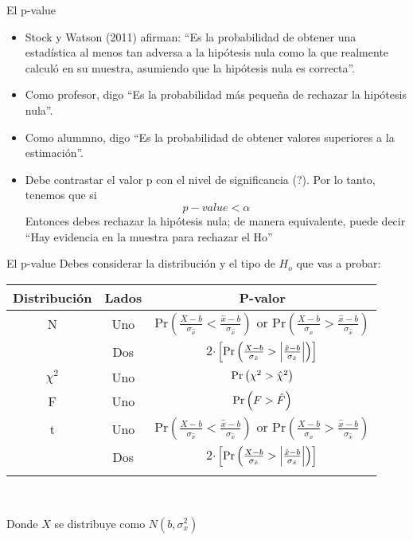 \begin{frame}{El p-value}
	\begin{itemize}
		\item Stock y Watson (2011) afirman: ``Es la probabilidad de obtener una estadística al menos tan adversa a la hipótesis nula como la que realmente calculó en su muestra, asumiendo que la hipótesis nula es correcta''.
		\item Como profesor, digo ``Es la probabilidad más pequeña de rechazar la hipótesis nula''.
		\item Como alummno, digo  ``Es la probabilidad de obtener valores superiores a la estimación''.
		\item Debe contrastar el valor p con el nivel de significancia (?). Por lo tanto, tenemos que si 
			$$p-value < \alpha$$
		Entonces debes rechazar la hipótesis nula; de manera equivalente, puede decir ``Hay evidencia en la muestra para rechazar el Ho''
	\end{itemize}
\end{frame}
\begin{frame}{El p-value}
	Debes considerar la distribución y el tipo de $H_o$ que vas a probar:\\
		\medskip
		{\small{\centering
		\begin{tabular}{ccc} 
			\hline
				Distribución & Lados & P-valor\\
			\hline
					\addlinespace[1ex]
				N		 & Uno & Pr$\left(\frac{X-b}{\sigma_{\hat{x}}} < \frac{\hat{x}-b}{\sigma_{\hat{x}}} \right)$ or Pr$\left(\frac{X-b}{\sigma_{\hat{x}}} > \frac{\hat{x}-b}{\sigma_{\hat{x}}} \right)$\\
					\addlinespace[1ex]
				{}       & Dos & 2$\cdot \left[ \textup{Pr}\left(\frac{X-b}{\sigma_{\hat{x}}} > \left|  \frac{\hat{x}-b}{\sigma_{\hat{x}}}\right| \right)\right] $\\
					\addlinespace[1ex]
			\hline
					\addlinespace[1ex]
				$\chi^2$ & Uno & $\textup{Pr}\left(\chi^{2} > \hat{\chi}^{2} \right) $\\
					\addlinespace[1ex]
			\hline
					\addlinespace[1ex]
				F		 & Uno & $\textup{Pr}\left( F > \hat{F} \right) $\\
					\addlinespace[1ex]
			\hline
					\addlinespace[1ex]
				t		 & Uno & Pr$\left(\frac{X-b}{\sigma_{\hat{x}}} < \frac{\hat{x}-b}{\sigma_{\hat{x}}} \right)$ or Pr$\left(\frac{X-b}{\sigma_{\hat{x}}} > \frac{\hat{x}-b}{\sigma_{\hat{x}}} \right)$\\
					\addlinespace[1ex]
				{}       & Dos & 2$\cdot \left[ \textup{Pr}\left(\frac{X-b}{\sigma_{\hat{x}}} > \left|  \frac{\hat{x}-b}{\sigma_{\hat{x}}}\right| \right)\right] $\\
					\addlinespace[1ex]
			\hline
		\end{tabular}}\\}
	\medskip
	Donde $X$ se distribuye como $N(b,\sigma_{x}^{2})$
\end{frame}
